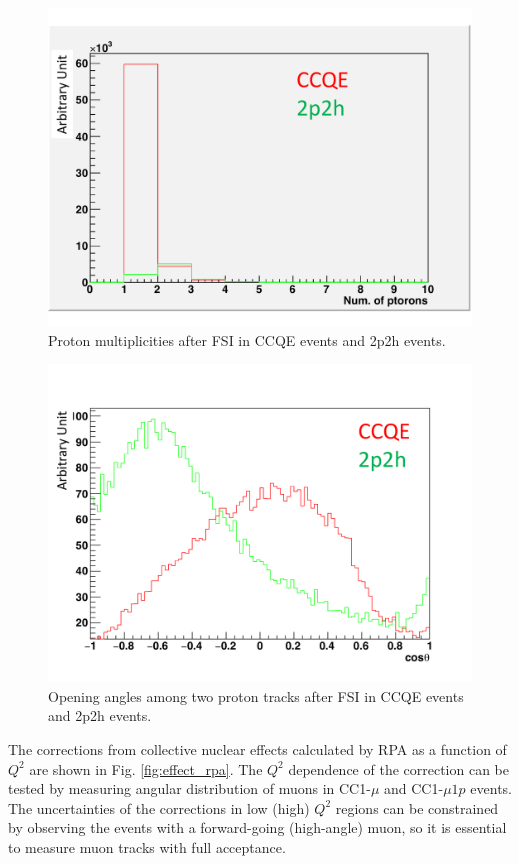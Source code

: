 \begin{figure}[tbh]
\begin{center}
\includegraphics[width=0.6\linewidth]{fig/2p2h_proton_multiplicity.pdf}
\end{center}
\caption{
Proton multiplicities after FSI in CCQE events and 2p2h events.
}
\label{fig:2p2h_proton_multiplicity}
\end{figure}

\begin{figure}[tbh]
\begin{center}
\includegraphics[width=0.6\linewidth]{fig/2p2h_proton_angle.pdf}
\end{center}
\caption{
Opening angles among two proton tracks after FSI in CCQE events and 2p2h events.
}
\label{fig:2p2h_proton_angle}
\end{figure}


The corrections from collective nuclear effects calculated by RPA as a function of $Q^{2}$ are shown in Fig. \ref{fig:effect_rpa}.
The $Q^{2}$ dependence of the correction can be tested by measuring angular distribution of muons in CC1-$\mu$ and CC1-$\mu 1p$ events.
The uncertainties of the corrections in low (high) $Q^{2}$ regions can be constrained by observing the events with a forward-going (high-angle) muon, so it is essential to measure muon tracks with full acceptance.


